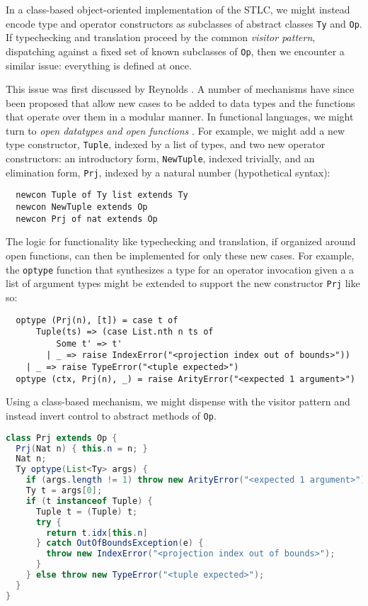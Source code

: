 
In a class-based object-oriented implementation of the STLC, we might instead encode type and operator constructors as subclasses of abstract classes \verb|Ty| and \verb|Op|. If typechecking and translation proceed by the common \emph{visitor pattern}, dispatching against a fixed set of {known} subclasses of \verb|Op|, then we encounter a similar issue: everything is defined at once. 

This issue was first discussed by Reynolds \cite{Reynolds75}. A number of mechanisms have since been proposed that allow new cases to be added to data types and the functions that operate over them in a modular manner. 
In functional languages, we might turn to \emph{open datatypes and open functions} \cite{conf/ppdp/LohH06}. For example, we might add a new type constructor, \verb|Tuple|, indexed by a list of types, and two new operator constructors: an introductory form, \verb|NewTuple|, indexed trivially, and an elimination form, \verb|Prj|, indexed by a natural number (hypothetical syntax):
\begin{lstlisting}
  newcon Tuple of Ty list extends Ty
  newcon NewTuple extends Op
  newcon Prj of nat extends Op
\end{lstlisting}

The logic for functionality like typechecking and translation, if organized around open functions, can then be implemented for only these new cases. For example, the \verb|optype| function that synthesizes a type for an operator invocation given a  a list of argument types might be extended to support the new constructor \verb|Prj| like so:
\begin{lstlisting}
  optype (Prj(n), [t]) = case t of 
      Tuple(ts) => (case List.nth n ts of 
          Some t' => t'
        | _ => raise IndexError("<projection index out of bounds>"))
    | _ => raise TypeError("<tuple expected>")
  optype (ctx, Prj(n), _) = raise ArityError("<expected 1 argument>")
\end{lstlisting}

Using a class-based mechanism, we might dispense with the visitor pattern and instead invert control to abstract methods of \verb|Op|. 

\begin{lstlisting}[language=Java]
class Prj extends Op {
  Prj(Nat n) { this.n = n; }
  Nat n;
  Ty optype(List<Ty> args) {
    if (args.length != 1) throw new ArityError("<expected 1 argument>")
    Ty t = args[0];
    if (t instanceof Tuple) {
      Tuple t = (Tuple) t;
      try {
        return t.idx[this.n]
      } catch OutOfBoundsException(e) {
        throw new IndexError("<projection index out of bounds>");
      }
    } else throw new TypeError("<tuple expected>");
  }
}
\end{lstlisting} 

